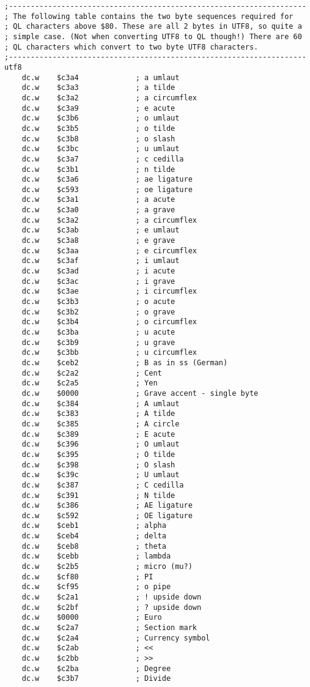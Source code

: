 \begin{lstlisting}[firstnumber=1, caption={Wolfgang's improved ql2utf8 Utility}]
;--------------------------------------------------------------------
; The following table contains the two byte sequences required for 
; QL characters above $80. These are all 2 bytes in UTF8, so quite a 
; simple case. (Not when converting UTF8 to QL though!) There are 60
; QL characters which convert to two byte UTF8 characters.
;--------------------------------------------------------------------
utf8
    dc.w    $c3a4             ; a umlaut
    dc.w    $c3a3             ; a tilde
    dc.w    $c3a2             ; a circumflex
    dc.w    $c3a9             ; e acute
    dc.w    $c3b6             ; o umlaut
    dc.w    $c3b5             ; o tilde
    dc.w    $c3b8             ; o slash
    dc.w    $c3bc             ; u umlaut
    dc.w    $c3a7             ; c cedilla
    dc.w    $c3b1             ; n tilde
    dc.w    $c3a6             ; ae ligature
    dc.w    $c593             ; oe ligature
    dc.w    $c3a1             ; a acute
    dc.w    $c3a0             ; a grave
    dc.w    $c3a2             ; a circumflex
    dc.w    $c3ab             ; e umlaut
    dc.w    $c3a8             ; e grave
    dc.w    $c3aa             ; e circumflex
    dc.w    $c3af             ; i umlaut
    dc.w    $c3ad             ; i acute
    dc.w    $c3ac             ; i grave
    dc.w    $c3ae             ; i circumflex
    dc.w    $c3b3             ; o acute
    dc.w    $c3b2             ; o grave
    dc.w    $c3b4             ; o circumflex
    dc.w    $c3ba             ; u acute
    dc.w    $c3b9             ; u grave
    dc.w    $c3bb             ; u circumflex
    dc.w    $ceb2             ; B as in ss (German)
    dc.w    $c2a2             ; Cent
    dc.w    $c2a5             ; Yen
    dc.w    $0000             ; Grave accent - single byte
    dc.w    $c384             ; A umlaut
    dc.w    $c383             ; A tilde
    dc.w    $c385             ; A circle
    dc.w    $c389             ; E acute
    dc.w    $c396             ; O umlaut
    dc.w    $c395             ; O tilde
    dc.w    $c398             ; O slash
    dc.w    $c39c             ; U umlaut
    dc.w    $c387             ; C cedilla
    dc.w    $c391             ; N tilde
    dc.w    $c386             ; AE ligature
    dc.w    $c592             ; OE ligature
    dc.w    $ceb1             ; alpha
    dc.w    $ceb4             ; delta
    dc.w    $ceb8             ; theta
    dc.w    $cebb             ; lambda
    dc.w    $c2b5             ; micro (mu?)
    dc.w    $cf80             ; PI
    dc.w    $cf95             ; o pipe
    dc.w    $c2a1             ; ! upside down
    dc.w    $c2bf             ; ? upside down
    dc.w    $0000             ; Euro
    dc.w    $c2a7             ; Section mark
    dc.w    $c2a4             ; Currency symbol
    dc.w    $c2ab             ; <<
    dc.w    $c2bb             ; >>
    dc.w    $c2ba             ; Degree
    dc.w    $c3b7             ; Divide
\end{lstlisting}


